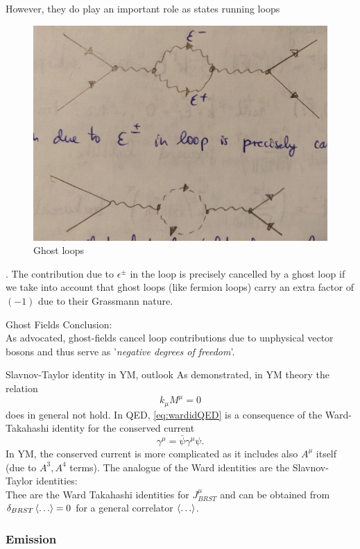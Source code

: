 However, they do play an important role as states running loops
\begin{figure}[h!]
	\centering
	\includegraphics[width=0.7\linewidth]{gfx/YMpictures/YMghostloops}
	\caption{Ghost loops}
	\label{fig:ymghostloops}
\end{figure}


. The contribution due to $\epsilon^\pm$ in the loop is precisely cancelled by a ghost loop
if we take into account that ghost loops (like fermion loops) carry an extra factor of $(-1)$ due to their Grassmann nature.
\begin{mybox}{Ghost Fields}
	Conclusion:\\
	As advocated, ghost-fields cancel loop contributions due to unphysical vector bosons and thus serve as ’\emph{negative degrees of freedom}’.
\end{mybox}
\begin{mybox}{Slavnov-Taylor identity in YM, outlook}
	As demonstrated, in YM theory the relation
	\begin{equation}
	\label{eq:wardidQED}
		k_\mu M^\mu =0
	\end{equation}
	does in general not hold. In QED, \ref{eq:wardidQED} is a consequence of the Ward-Takahashi identity for the conserved current
	\begin{equation}
		\gamma^\mu = \bar{\psi} \gamma^\mu \psi.
	\end{equation}
	In YM, the conserved current is more complicated as it includes also $A^\mu$ itself (due to $A^3,A^4$ terms). The analogue of the Ward identities are the Slavnov-Taylor identities:\\
	Thee are the Ward Takahashi identities for $J^\mu_{BRST}$ and can be obtained from $\delta_{BRST}\expval{\dots} =0$ for a general correlator $\expval{\dots}$.
\end{mybox}
\subsubsection{Emission}

